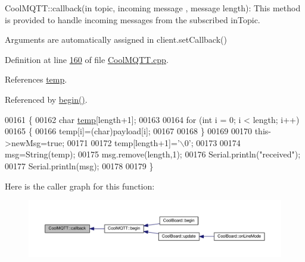Cool\+M\+Q\+T\+T\+::callback(in topic, incoming message , message length)\+: This method is provided to handle incoming messages from the subscribed in\+Topic.

Arguments are automatically assigned in client.\+set\+Callback() 

Definition at line \hyperlink{_cool_m_q_t_t_8cpp_source_l00160}{160} of file \hyperlink{_cool_m_q_t_t_8cpp_source}{Cool\+M\+Q\+T\+T.\+cpp}.



References \hyperlink{_irene3000_8h_source_l00025}{temp}.



Referenced by \hyperlink{_cool_m_q_t_t_8cpp_source_l00026}{begin()}.


\begin{DoxyCode}
00161 \{
00162     \textcolor{keywordtype}{char} \hyperlink{_irene3000_8h_a5905d48604152cf57aa6bfa087b49173}{temp}[length+1];
00163 
00164     \textcolor{keywordflow}{for} (\textcolor{keywordtype}{int} i = 0; i < length; i++) 
00165     \{
00166         temp[i]=(char)payload[i]; 
00167 
00168     \}
00169 
00170     this->newMsg=\textcolor{keyword}{true};
00171 
00172     temp[length+1]=\textcolor{charliteral}{'\(\backslash\)0'};
00173 
00174     msg=String(temp);
00175     msg.remove(length,1);
00176     Serial.println(\textcolor{stringliteral}{"received"});
00177     Serial.println(msg);
00178 
00179 \}
\end{DoxyCode}
Here is the caller graph for this function\+:
\nopagebreak
\begin{figure}[H]
\begin{center}
\leavevmode
\includegraphics[width=350pt]{class_cool_m_q_t_t_a30d82ad665bfb603f46ecdbc290775df_icgraph}
\end{center}
\end{figure}
\mbox{\label{class_cool_m_q_t_t_a9b703de4f1358f0ee7a5e8c44979c648}} 
